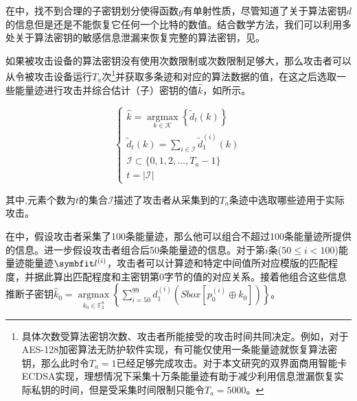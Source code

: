 {	\begin{example}
		在中，找不到合理的子密钥划分使得函数$g$有单射性质，尽管知道了关于算法密钥$d$的信息但是还是不能恢复它任何一个比特的数值。结合数学方法，我们可以利用多处关于算法密钥的敏感信息泄漏来恢复完整的算法密钥，见。
	\end{example}
	
	如果被攻击设备的算法密钥没有使用次数限制或次数限制足够大，那么攻击者可以从令被攻击设备运行$T_a$次\footnote{具体次数受算法密钥次数、攻击者所能接受的攻击时间共同决定。例如，对于AES-128加密算法无防护软件实现，有可能仅使用一条能量迹就恢复算法密钥，那么此时令$T_a=1$已经足够完成攻击。对于本文研究的双界面商用智能卡ECDSA实现，理想情况下采集十万条能量迹有助于减少利用信息泄漏恢复实际私钥的时间，但是受采集时间限制只能令$T_a=5000$。}并获取多条迹和对应的算法数据的值，在这之后选取一些能量迹进行攻击并综合估计（子）密钥的值$\hat k$，如所示。
	
	\begin{equation}\label{eq:ttracek}
		\begin{cases}
			\hat k=\mathop{\mathrm{argmax}}\limits_{k\in\mathcal K}\left\lbrace \tilde d_t(k)\right\rbrace \\
			\tilde d_t(k)=\sum\limits_{i\in \mathcal I}\tilde d^{(i)}_1(k)\\
			\mathcal I\subset \{0,1,2,\dots,T_a-1\}\\
			t=\vert\mathcal I\vert
		\end{cases}
	\end{equation}
	
	\noindent 其中,元素个数为$t$的集合$\mathcal I$描述了攻击者从采集到的$T_a$条迹中选取哪些迹用于实际攻击。
	
	\begin{example}
		在中，假设攻击者采集了100条能量迹，那么他可以组合不超过100条能量迹所提供的信息。进一步假设攻击者组合后50条能量迹的信息。对于第$i$条($50\le i<100$)能量迹能量迹$\Vector {l^{(i)}}$，攻击者可以计算迹和特定中间值所对应模版的匹配程度，并据此算出匹配程度和主密钥第0字节的值的对应关系。接着他组合这些信息推断子密钥$\hat k_0=\mathop{\mathrm{argmax}}\limits_{k_0\in\mathbb F_2^8}\left\lbrace \sum\limits_{i=50}^{99}d_1^{(i)}\left( Sbox[p^{(i)}_0\oplus k_0]\right)\right\rbrace $。
	\end{example}
	
}
